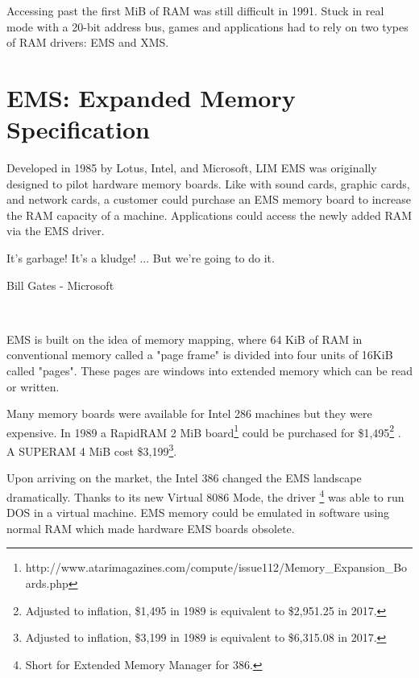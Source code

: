 \label{ems_vs_xms}
Accessing past the first MiB of RAM was still difficult in 1991. Stuck in real mode with a 20-bit address bus, games and applications had to rely on two types of RAM drivers: EMS and XMS.\\
\par

\section{EMS: Expanded Memory Specification}
Developed in 1985 by Lotus, Intel, and Microsoft, LIM EMS was originally designed to pilot hardware memory boards. Like with sound cards, graphic cards, and network cards, a customer could purchase an EMS memory board to increase the RAM capacity of a machine. Applications could access the newly added RAM via the EMS driver.\\
\par
\begin{fancyquotes}
It's garbage! It's a kludge! ... But we're going to do it.\\
\par
Bill Gates - Microsoft
\end{fancyquotes}\\
\par
 EMS is built on the idea of memory mapping, where 64 KiB of RAM in conventional memory called a "page frame" is divided into four units of 16KiB called "pages". These pages are windows into extended memory which can be read or written.\\
\par


Many memory boards were available for Intel 286 machines but they were expensive. In 1989 a RapidRAM 2 MiB board\footnote{http://www.atarimagazines.com/compute/issue112/Memory\_Expansion\_Boards.php} could be purchased for \$1,495\footnote{Adjusted to inflation, \$1,495 in 1989 is equivalent to \$2,951.25 in 2017.} . A SUPERAM 4 MiB cost \$3,199\footnote{Adjusted to inflation, \$3,199 in 1989 is equivalent to \$6,315.08 in 2017.}.\\
\par
Upon arriving on the market, the Intel 386 changed the EMS landscape dramatically. Thanks to its new Virtual 8086 Mode, the driver \footnote{Short for Extended Memory Manager for 386.} was able to run DOS in a virtual machine. EMS memory could be emulated in software using normal RAM which made hardware EMS boards  obsolete.\\



